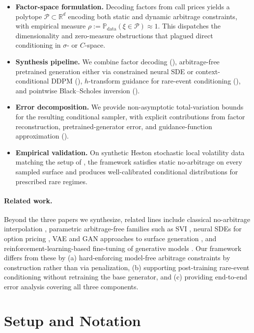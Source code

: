 \documentclass{article}
\newcommand{\R}{\mathbb{R}}
\newcommand{\Prob}{\mathbb{P}}
\newcommand{\1}{\mathbf{1}}
\newcommand{\cP}{\mathcal{P}}
\begin{document}
\begin{itemize}
\item \textbf{Factor-space formulation.} Decoding factors from call prices yields a polytope $\cP \subset \R^d$ encoding both static and dynamic arbitrage constraints, with empirical measure $\rho := \Prob_{\text{data}}(\xi \in \cP) \approx 1$. This dispatches the dimensionality and zero-measure obstructions that plagued direct conditioning in $\sigma$- or $C$-space.
\item \textbf{Synthesis pipeline.} We combine factor decoding (), arbitrage-free pretrained generation either via constrained neural SDE or context-conditional DDPM (), $h$-transform guidance for rare-event conditioning (), and pointwise Black--Scholes inversion ().
\item \textbf{Error decomposition.} We provide non-asymptotic total-variation bounds for the resulting conditional sampler, with explicit contributions from factor reconstruction, pretrained-generator error, and guidance-function approximation ().
\item \textbf{Empirical validation.} On synthetic Heston stochastic local volatility data \citep{jex1999} matching the setup of \citet{cohen2021}, the framework satisfies static no-arbitrage on every sampled surface and produces well-calibrated conditional distributions for prescribed rare regimes.
\end{itemize}

\paragraph{Related work.} Beyond the three papers we synthesize, related lines include classical no-arbitrage interpolation \citep{kahale2004,fengler2009}, parametric arbitrage-free families such as SVI \citep{gatheral2014}, neural SDEs for option pricing \citep{gierjatowicz2020,cuchiero2020}, VAE and GAN approaches to surface generation \citep{bergeron2022,vuletic2024}, and reinforcement-learning-based fine-tuning of generative models \citep{uehara2024,fan2023}. Our framework differs from these by (a) hard-enforcing model-free arbitrage constraints by construction rather than via penalization, (b) supporting post-training rare-event conditioning without retraining the base generator, and (c) providing end-to-end error analysis covering all three components.

\section{Setup and Notation}
\label{sec:setup}
\end{document}
